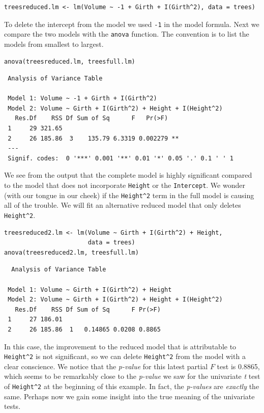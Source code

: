 \documentclass[captions=tableheading]{scrbook}
\begin{document}
\begin{example}
\begin{verbatim}
treesreduced.lm <- lm(Volume ~ -1 + Girth + I(Girth^2), data = trees)
\end{verbatim}

To delete the intercept from the model we used \texttt{-1} in the model formula. Next we compare the two models with the \texttt{anova} function. The convention is to list the models from smallest to largest.


\begin{verbatim}
anova(treesreduced.lm, treesfull.lm)
\end{verbatim}

\begin{verbatim}
 Analysis of Variance Table
 
 Model 1: Volume ~ -1 + Girth + I(Girth^2)
 Model 2: Volume ~ Girth + I(Girth^2) + Height + I(Height^2)
   Res.Df    RSS Df Sum of Sq      F   Pr(>F)   
 1     29 321.65                                
 2     26 185.86  3    135.79 6.3319 0.002279 **
 ---
 Signif. codes:  0 '***' 0.001 '**' 0.01 '*' 0.05 '.' 0.1 ' ' 1
\end{verbatim}

We see from the output that the complete model is highly significant compared to the model that does not incorporate \texttt{Height} or the \texttt{Intercept}. We wonder (with our tongue in our cheek) if the \texttt{Height\textasciicircum{}2} term in the full model is causing all of the trouble. We will fit an alternative reduced model that only deletes \texttt{Height\textasciicircum{}2}. 


\begin{verbatim}
treesreduced2.lm <- lm(Volume ~ Girth + I(Girth^2) + Height, 
                       data = trees)
anova(treesreduced2.lm, treesfull.lm)
\end{verbatim}

\begin{verbatim}
  Analysis of Variance Table
 
 Model 1: Volume ~ Girth + I(Girth^2) + Height
 Model 2: Volume ~ Girth + I(Girth^2) + Height + I(Height^2)
   Res.Df    RSS Df Sum of Sq      F Pr(>F)
 1     27 186.01                           
 2     26 185.86  1   0.14865 0.0208 0.8865
\end{verbatim}

In this case, the improvement to the reduced model that is attributable to \texttt{Height\textasciicircum{}2} is not significant, so we can delete \texttt{Height\textasciicircum{}2} from the model with a clear conscience. We notice that the \emph{p-value} for this latest partial $F$ test is 0.8865, which seems to be remarkably close to the \emph{p-value} we saw for the univariate \emph{t} test of \texttt{Height\textasciicircum{}2} at the beginning of this example. In fact, the \emph{p-values} are \emph{exactly} the same. Perhaps now we gain some insight into the true meaning of the univariate tests.

\end{example}
\end{document}
